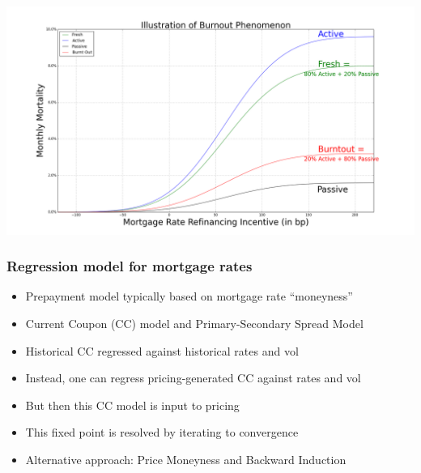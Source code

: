 \documentclass{beamer}
\begin{document}
\begin{frame}
\includegraphics[scale=0.25]{burnout.png}
\end{frame}

\begin{frame}
\frametitle{Regression model for mortgage rates}
\begin{itemize}
\item Prepayment model typically based on mortgage rate ``moneyness''
\item Current Coupon (CC) model and Primary-Secondary Spread Model
\item Historical CC regressed against historical rates and vol
\item Instead, one can regress pricing-generated CC against rates and vol
\item But then this CC model is input to pricing
\item This fixed point is resolved by iterating to convergence
\item Alternative approach: Price Moneyness and Backward Induction
\end{itemize}
\end{frame}
\end{document}
